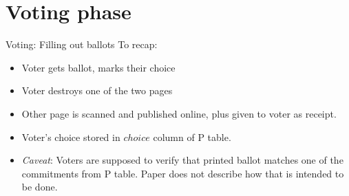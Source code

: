\documentclass{beamer}
\begin{document}
\section{Voting phase}

\begin{frame}{Voting: Filling out ballots}
	To recap:
	\begin{itemize}
		\item Voter gets ballot, marks their choice
		\item Voter destroys one of the two pages
		\item Other page is scanned and published online, plus given to voter as receipt.
		\item Voter's choice stored in $choice$ column of P table.
		\item \emph{Caveat}: Voters are supposed to verify that printed
			ballot matches one of the commitments from P table.
			Paper does not describe how that is intended to be
			done.
	\end{itemize}
\end{frame}
\end{document}
